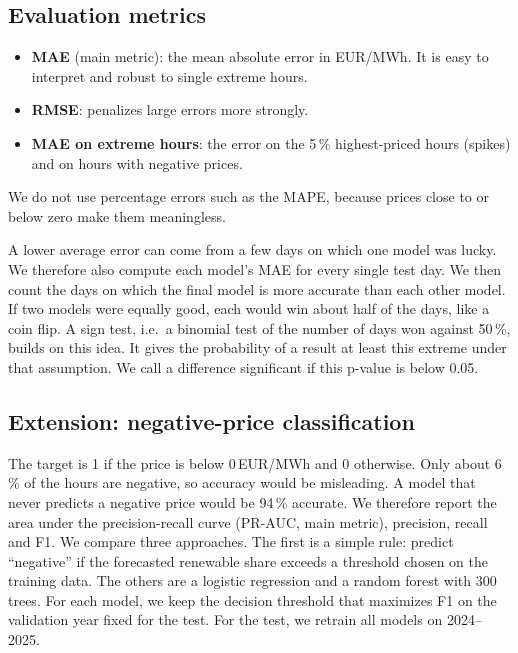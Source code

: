 \documentclass[12pt,oneside]{article}
\begin{document}
\subsection{Evaluation metrics}

\begin{itemize}
    \item \textbf{MAE} (main metric): the mean absolute error in EUR/MWh. It is easy to interpret and robust to single extreme hours.
    \item \textbf{RMSE}: penalizes large errors more strongly.
    \item \textbf{MAE on extreme hours}: the error on the 5\,\% highest-priced hours (spikes) and on hours with negative prices.
\end{itemize}

We do not use percentage errors such as the MAPE, because prices close to or below zero make them meaningless.

A lower average error can come from a few days on which one model was lucky. We therefore also compute each model's MAE for every single test day. We then count the days on which the final model is more accurate than each other model. If two models were equally good, each would win about half of the days, like a coin flip. A sign test, i.e.\ a binomial test of the number of days won against 50\,\%, builds on this idea. It gives the probability of a result at least this extreme under that assumption. We call a difference significant if this p-value is below 0.05.

\subsection{Extension: negative-price classification} \label{sec:classmethod}

The target is 1 if the price is below 0\,EUR/MWh and 0 otherwise. Only about 6\,\% of the hours are negative, so accuracy would be misleading. A model that never predicts a negative price would be 94\,\% accurate. We therefore report the area under the precision-recall curve (PR-AUC, main metric), precision, recall and F1. We compare three approaches. The first is a simple rule: predict \enquote{negative} if the forecasted renewable share exceeds a threshold chosen on the training data. The others are a logistic regression and a random forest with 300 trees. For each model, we keep the decision threshold that maximizes F1 on the validation year fixed for the test. For the test, we retrain all models on 2024--2025.
\end{document}
